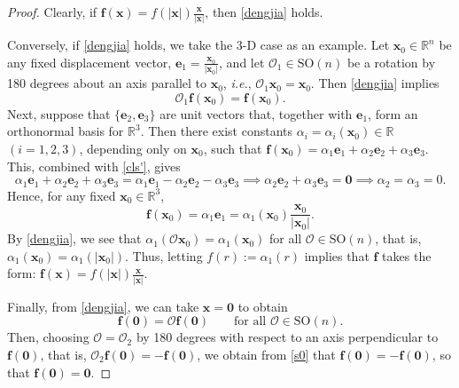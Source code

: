 \documentclass[11pt,reqno]{amsart}
\numberwithin{rk}{section}
\numberwithin{prop}{section}
\numberwithin{mydef}{section}
\numberwithin{lem}{section}
\numberwithin{equation}{section}
\numberwithin{thm}{section}
\begin{document}
\begin{proof}
Clearly, if $\boldsymbol{f}(\boldsymbol{x})=f(|\boldsymbol{x}|)\frac{\boldsymbol{x}}{|\boldsymbol{x}|}$, then \eqref{dengjia} holds.

Conversely, if \eqref{dengjia} holds, we take the 3-D case as an example. Let $\boldsymbol{x}_0\in \mathbb{R}^n$ be any fixed displacement vector, $\boldsymbol{e}_1=\frac{\boldsymbol{x}_0}{|\boldsymbol{x}_0|}$, and let $\mathcal{O}_1\in \mathrm{SO}(n)$ be a rotation by 180 degrees about an axis parallel to $\boldsymbol{x}_0$, \textit{i.e.}, $\mathcal{O}_1\boldsymbol{x}_0=\boldsymbol{x}_0$. Then \eqref{dengjia} implies
\begin{equation}\label{cls'}
\mathcal{O}_1\boldsymbol{f}(\boldsymbol{x}_0)=\boldsymbol{f}(\boldsymbol{x}_0).
\end{equation}
Next, suppose that $\{\boldsymbol{e}_2,\boldsymbol{e}_3\}$ are unit vectors that, together with $\boldsymbol{e}_1$, form an orthonormal basis for $\mathbb{R}^3$. 
Then there exist constants $\alpha_i=\alpha_i(\boldsymbol{x}_0)\in \mathbb{R}$ $(i=1,2,3)$, depending only on $\boldsymbol{x}_0$, such that $\boldsymbol{f}(\boldsymbol{x}_0)=\alpha_1\boldsymbol{e}_1+\alpha_2\boldsymbol{e}_2+\alpha_3\boldsymbol{e}_3$. This, combined with \eqref{cls'}, gives 
\begin{equation*}
\alpha_1\boldsymbol{e}_1+\alpha_2\boldsymbol{e}_2+\alpha_3\boldsymbol{e}_3=\alpha_1\boldsymbol{e}_1-\alpha_2\boldsymbol{e}_2-\alpha_3\boldsymbol{e}_3\implies \alpha_2\boldsymbol{e}_2+\alpha_3\boldsymbol{e}_3=\boldsymbol{0}\implies \alpha_2=\alpha_3=0.
\end{equation*}
Hence, for any fixed $\boldsymbol{x}_0\in \mathbb{R}^3$,
\begin{equation*}
\boldsymbol{f}(\boldsymbol{x}_0)=\alpha_1\boldsymbol{e}_1=\alpha_1(\boldsymbol{x}_0)\frac{\boldsymbol{x}_0}{|\boldsymbol{x}_0|}.
\end{equation*}
By \eqref{dengjia}, we see that $\alpha_1(\mathcal{O}\boldsymbol{x}_0)=\alpha_1(\boldsymbol{x}_0)$ for all $\mathcal{O}\in \mathrm{SO}(n)$, that is, $\alpha_1(\boldsymbol{x}_0)=\alpha_1(|\boldsymbol{x}_0|)$. 
Thus, letting $f(r):=\alpha_1(r)$ implies that $\boldsymbol{f}$ takes the form: $\boldsymbol{f}(\boldsymbol{x})=f(|\boldsymbol{x}|)\frac{\boldsymbol{x}}{|\boldsymbol{x}|}$. 


Finally, from \eqref{dengjia}, we can take $\boldsymbol{x}=\boldsymbol{0}$ to obtain
\begin{equation}\label{s0}
\boldsymbol{f}(\boldsymbol{0})=\mathcal{O}\boldsymbol{f}(\boldsymbol{0}) \qquad \text{for all $\mathcal{O}\in \mathrm{SO}(n)$}.
\end{equation}
Then, choosing $\mathcal{O}=\mathcal{O}_2$ by 180 degrees with respect to 
an axis perpendicular to $\boldsymbol{f}(\boldsymbol{0})$, that is, $\mathcal{O}_2\boldsymbol{f}(\boldsymbol{0})=-\boldsymbol{f}(\boldsymbol{0})$, we obtain from \eqref{s0} that $\boldsymbol{f}(\boldsymbol{0})=-\boldsymbol{f}(\boldsymbol{0})$, so that $\boldsymbol{f}(\boldsymbol{0})=\boldsymbol{0}$. 
\end{proof}
\end{document}
